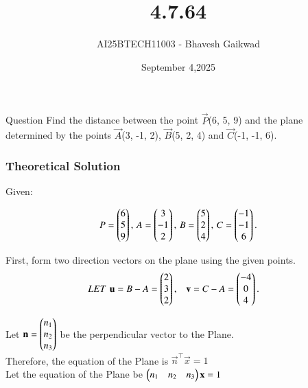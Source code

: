 \documentclass{beamer}
\title
{4.7.64}
\date{September 4,2025}
\author 
{AI25BTECH11003 - Bhavesh Gaikwad}
\begin{document}
\frame{\titlepage}
\begin{frame}{Question}
\centering
Find the distance between the point $\vec{P}$(6, 5, 9) and the plane determined by the points $\vec{A}$(3, -1, 2), $\vec{B}$(5, 2, 4) and $\vec{C}$(-1, -1, 6).
\end{frame}


\begin{frame}[fragile]
    \frametitle{Theoretical Solution}
Given:

\begin{align}
P = \begin{pmatrix}6\\5\\9\end{pmatrix}, \,
A = \begin{pmatrix}3\\-1\\2\end{pmatrix}, \,
B = \begin{pmatrix}5\\2\\4\end{pmatrix}, \,
C = \begin{pmatrix}-1\\-1\\6\end{pmatrix}.
\end{align}

First, form two direction vectors on the plane using the given points.
\begin{align} LET \, \,
\mathbf{u} &= B - A = \begin{pmatrix}2\\3\\2\end{pmatrix}, &
\mathbf{v} &= C - A = \begin{pmatrix}-4\\0\\4\end{pmatrix}.
\end{align}

Let $\mathbf{n} = \begin{pmatrix}n_1 \\ n_2 \\ n_3\end{pmatrix}$ be the perpendicular vector to the Plane.\\
Therefore, the equation of the Plane is $\vec{n}^\top \vec{x}=1$\\
Let the equation of the Plane be $\begin{pmatrix}n_1 & n_2 & n_3\end{pmatrix}\mathbf{x}=1$\\
\end{frame}
\end{document}

